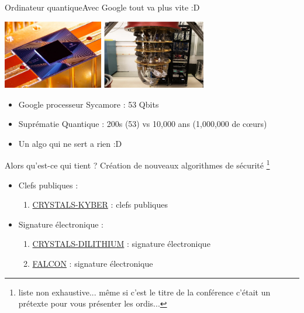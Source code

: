 \documentclass{beamer}
\begin{document}
\begin{frame}{Ordinateur quantique}{Avec Google tout va plus vite :D }
  \begin{center}
    \includegraphics[height=3cm]{sycamore1.jpeg}
    \includegraphics[height=3cm]{sycamore2.png}
  \end{center}
  \begin{itemize}
  \item Google processeur Sycamore : 53 Qbits
  \item Supr\'ematie Quantique : 200s (53) vs 10,000 ans (1,000,000 de c\oe{}urs)
  \item Un algo qui ne sert a rien :D
  \end{itemize}
\end{frame}

\begin{frame}{Alors qu'est-ce qui tient ?}
  Cr\'eation de nouveaux algorithmes de s\'ecurit\'e \footnote{liste non exhaustive... m\^eme si c'est le titre de la conf\'erence c'\'etait un pr\'etexte pour vous pr\'esenter les ordis...}
  \begin{itemize}
    \item Clefs publiques :
      \begin{enumerate}
      \item \href{https://pq-crystals.org/}{CRYSTALS-KYBER} : clefs publiques
      \end{enumerate}
    \item Signature \'electronique :
      \begin{enumerate}
      \item \href{https://pq-crystals.org/}{CRYSTALS-DILITHIUM} : signature \'electronique
      \item \href{https://pq-crystals.org/}{FALCON} : signature \'electronique
      \end{enumerate}
  \end{itemize}
\end{frame}
\end{document}
